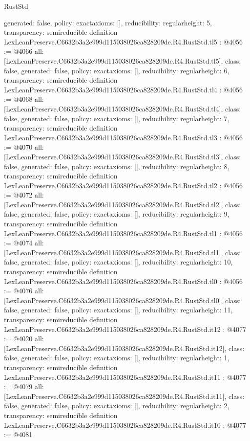 \begin{lexlean}{RustStd}
\begin{coremodule}
{  generated: false,
  policy: exact{axioms: []},
  reducibility: regular{height: 5},
  transparency: semireducible
}
definition LexLeanPreserve.C6632b3a2e999d115038026ca828209de.R4.RustStd.tl5 : @4056 := @4066 {
  all: [LexLeanPreserve.C6632b3a2e999d115038026ca828209de.R4.RustStd.tl5],
  class: false,
  generated: false,
  policy: exact{axioms: []},
  reducibility: regular{height: 6},
  transparency: semireducible
}
definition LexLeanPreserve.C6632b3a2e999d115038026ca828209de.R4.RustStd.tl4 : @4056 := @4068 {
  all: [LexLeanPreserve.C6632b3a2e999d115038026ca828209de.R4.RustStd.tl4],
  class: false,
  generated: false,
  policy: exact{axioms: []},
  reducibility: regular{height: 7},
  transparency: semireducible
}
definition LexLeanPreserve.C6632b3a2e999d115038026ca828209de.R4.RustStd.tl3 : @4056 := @4070 {
  all: [LexLeanPreserve.C6632b3a2e999d115038026ca828209de.R4.RustStd.tl3],
  class: false,
  generated: false,
  policy: exact{axioms: []},
  reducibility: regular{height: 8},
  transparency: semireducible
}
definition LexLeanPreserve.C6632b3a2e999d115038026ca828209de.R4.RustStd.tl2 : @4056 := @4072 {
  all: [LexLeanPreserve.C6632b3a2e999d115038026ca828209de.R4.RustStd.tl2],
  class: false,
  generated: false,
  policy: exact{axioms: []},
  reducibility: regular{height: 9},
  transparency: semireducible
}
definition LexLeanPreserve.C6632b3a2e999d115038026ca828209de.R4.RustStd.tl1 : @4056 := @4074 {
  all: [LexLeanPreserve.C6632b3a2e999d115038026ca828209de.R4.RustStd.tl1],
  class: false,
  generated: false,
  policy: exact{axioms: []},
  reducibility: regular{height: 10},
  transparency: semireducible
}
definition LexLeanPreserve.C6632b3a2e999d115038026ca828209de.R4.RustStd.tl0 : @4056 := @4076 {
  all: [LexLeanPreserve.C6632b3a2e999d115038026ca828209de.R4.RustStd.tl0],
  class: false,
  generated: false,
  policy: exact{axioms: []},
  reducibility: regular{height: 11},
  transparency: semireducible
}
definition LexLeanPreserve.C6632b3a2e999d115038026ca828209de.R4.RustStd.it12 : @4077 := @4020 {
  all: [LexLeanPreserve.C6632b3a2e999d115038026ca828209de.R4.RustStd.it12],
  class: false,
  generated: false,
  policy: exact{axioms: []},
  reducibility: regular{height: 1},
  transparency: semireducible
}
definition LexLeanPreserve.C6632b3a2e999d115038026ca828209de.R4.RustStd.it11 : @4077 := @4079 {
  all: [LexLeanPreserve.C6632b3a2e999d115038026ca828209de.R4.RustStd.it11],
  class: false,
  generated: false,
  policy: exact{axioms: []},
  reducibility: regular{height: 2},
  transparency: semireducible
}
definition LexLeanPreserve.C6632b3a2e999d115038026ca828209de.R4.RustStd.it10 : @4077 := @4081 {
}
\end{coremodule}
\end{lexlean}
